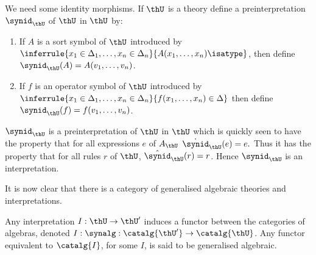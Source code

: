  We need some identity morphisms.
  If $\thU$ is a theory define a preinterpretation $\synid_\thU$ of $\thU$ in $\thU$ by:
  \begin{enumerate}
    \item If $A$ is a sort symbol of $\thU$ introduced by $\inferrule{x_1\in\Delta_1,\ldots,x_n\in\Delta_n}{A(x_1,\ldots,x_n)\isatype}$, then define $\synid_\thU(A)=A(v_1,\ldots,v_n)$.
    \item If $f$ is an operator symbol of $\thU$ introduced by $\inferrule{x_1\in\Delta_1,\ldots,x_n\in\Delta_n}{f(x_1,\ldots,x_n)\in\Delta}$ then define $\synid_\thU(f)=f(v_1,\ldots,v_n)$.
  \end{enumerate}

  $\synid_\thU$ is a preinterpretation of $\thU$ in $\thU$ which is quickly seen to have the property that for all expressions $e$ of $A_\thU$ $\dot \synid_\thU(e)=e.$
  Thus it has the property that for all rules $r$ of $\thU$, $\hat\synid_\thU(r)=r$.
  Hence $\synid_\thU$ is an interpretation.

  It is now clear that there is a category of generalised algebraic theories and interpretations.

  Any interpretation $I:\thU\to\thU'$ induces a functor between the categories of algebras, denoted $I:\synalg: \catalg{\thU'}\to\catalg{\thU}$.
  Any functor equivalent to $\catalg{I}$, for some $I$, is said to be generalised algebraic.


